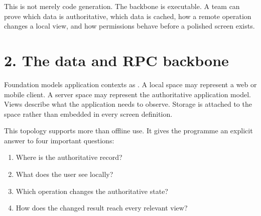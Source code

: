 \documentclass[10pt]{article}
\begin{document}

This is not merely code generation. The backbone is executable. A team can prove which data is authoritative, which data is cached, how a remote operation changes a local view, and how permissions behave before a polished screen exists.

\newpage
\section{2. The data and RPC backbone}

Foundation models application contexts as . A local space may represent a web or mobile client. A server space may represent the authoritative application model. Views describe what the application needs to observe. Storage is attached to the space rather than embedded in every screen definition.

\begin{center}
\end{center}

This topology supports more than offline use. It gives the programme an explicit answer to four important questions:

\begin{enumerate}
  \item Where is the authoritative record?
  \item What does the user see locally?
  \item Which operation changes the authoritative state?
  \item How does the changed result reach every relevant view?
\end{enumerate}
\end{document}
